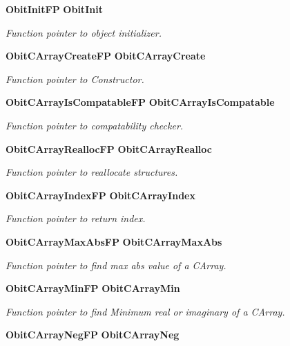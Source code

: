 \begin{CompactItemize}
{\bf Obit\-Init\-FP} {\bf Obit\-Init}
\begin{CompactList}\small\item\em Function pointer to object initializer. \item\end{CompactList}\item 
{\bf Obit\-CArray\-Create\-FP} {\bf Obit\-CArray\-Create}
\begin{CompactList}\small\item\em Function pointer to Constructor. \item\end{CompactList}\item 
{\bf Obit\-CArray\-Is\-Compatable\-FP} {\bf Obit\-CArray\-Is\-Compatable}
\begin{CompactList}\small\item\em Function pointer to compatability checker. \item\end{CompactList}\item 
{\bf Obit\-CArray\-Realloc\-FP} {\bf Obit\-CArray\-Realloc}
\begin{CompactList}\small\item\em Function pointer to reallocate structures. \item\end{CompactList}\item 
{\bf Obit\-CArray\-Index\-FP} {\bf Obit\-CArray\-Index}
\begin{CompactList}\small\item\em Function pointer to return index. \item\end{CompactList}\item 
{\bf Obit\-CArray\-Max\-Abs\-FP} {\bf Obit\-CArray\-Max\-Abs}
\begin{CompactList}\small\item\em Function pointer to find max abs value of a CArray. \item\end{CompactList}\item 
{\bf Obit\-CArray\-Min\-FP} {\bf Obit\-CArray\-Min}
\begin{CompactList}\small\item\em Function pointer to find Minimum real or imaginary of a CArray. \item\end{CompactList}\item 
{\bf Obit\-CArray\-Neg\-FP} {\bf Obit\-CArray\-Neg}

\end{CompactItemize}

